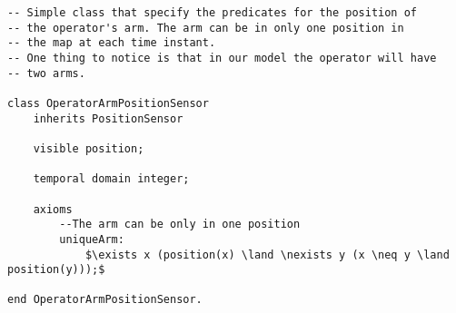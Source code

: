\begin{lstlisting}[fontadjust, mathescape, frame=single] 
-- Simple class that specify the predicates for the position of
-- the operator's arm. The arm can be in only one position in 
-- the map at each time instant. 
-- One thing to notice is that in our model the operator will have
-- two arms.

class OperatorArmPositionSensor
    inherits PositionSensor

    visible position;

    temporal domain integer;

    axioms
        --The arm can be only in one position
        uniqueArm: 
            $\exists x (position(x) \land \nexists y (x \neq y \land position(y)));$

end OperatorArmPositionSensor.
\end{lstlisting}